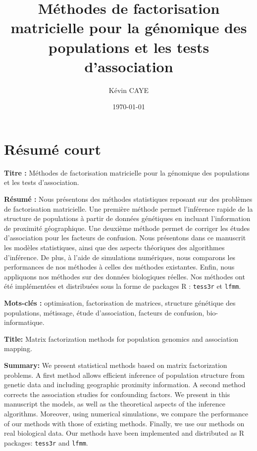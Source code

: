 \documentclass[12pt,a4paper,twoside]{ugathesis}
\author{Kévin CAYE}
\date{\today}
\title{Méthodes de factorisation matricielle pour la génomique des populations et les tests d'association}
\begin{document}
\maketitle
\tableofcontents

\baselineskip 0.7cm
\frontmatter

\chapter{Résumé court}
\label{sec:org3f04c2d}

\noindent \textbf{Titre :} Méthodes de factorisation matricielle pour la génomique des
populations et les tests d'association.

\noindent \textbf{Résumé :} Nous présentons des méthodes statistiques reposant sur des
problèmes de factorisation matricielle. Une première méthode permet l'inférence
rapide de la structure de populations à partir de données génétiques en incluant
l'information de proximité géographique. Une deuxième méthode permet de corriger
les études d'association pour les facteurs de confusion. Nous présentons dans ce
manuscrit les modèles statistiques, ainsi que des aspects théoriques des
algorithmes d'inférence. De plus, à l'aide de simulations numériques, nous
comparons les performances de nos méthodes à celles des méthodes existantes.
Enfin, nous appliquons nos méthodes sur des données biologiques réelles. Nos
méthodes ont été implémentées et distribuées sous la forme de packages R :
\texttt{tess3r} et \texttt{lfmm}.

\noindent \textbf{Mots-clés :} optimisation, factorisation de matrices, structure génétique des
populations, métissage, étude d'association, facteurs de confusion, bio-informatique.

\vspace{0.5cm}

\noindent \textbf{Title:} Matrix factorization methods for population genomics and association
mapping.

\noindent \textbf{Summary:} We present statistical methods based on matrix
factorization problems. A first method allows efficient inference of population
structure from genetic data and including geographic proximity information. A
second method corrects the association studies for confounding factors. We
present in this manuscript the models, as well as the theoretical aspects of the
inference algorithms. Moreover, using numerical simulations, we compare the
performance of our methods with those of existing methods. Finally, we use our
methods on real biological data. Our methods have been implemented and
distributed as R packages: \texttt{tess3r} and \texttt{lfmm}.
\end{document}
